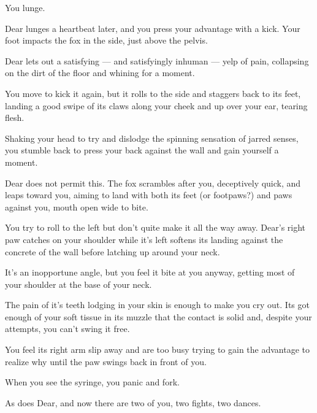 You lunge.

Dear lunges a heartbeat later, and you press your advantage with a kick. Your foot impacts the fox in the side, just above the pelvis.

Dear lets out a satisfying --- and satisfyingly inhuman --- yelp of pain, collapsing on the dirt of the floor and whining for a moment.

You move to kick it again, but it rolls to the side and staggers back to its feet, landing a good swipe of its claws along your cheek and up over your ear, tearing flesh.

Shaking your head to try and dislodge the spinning sensation of jarred senses, you stumble back to press your back against the wall and gain yourself a moment.

Dear does not permit this. The fox scrambles after you, deceptively quick, and leaps toward you, aiming to land with both its feet (or footpaws?) and paws against you, mouth open wide to bite.

You try to roll to the left but don't quite make it all the way away. Dear's right paw catches on your shoulder while it's left softens its landing against the concrete of the wall before latching up around your neck.

It's an inopportune angle, but you feel it bite at you anyway, getting most of your shoulder at the base of your neck.

The pain of it's teeth lodging in your skin is enough to make you cry out. Its got enough of your soft tissue in its muzzle that the contact is solid and, despite your attempts, you can't swing it free.

\newpage

\null
\vfill

\noindent You feel its right arm slip away and are too busy trying to gain the advantage to realize why until the paw swings back in front of you.

\vfill

\newpage

\null
\vfill

When you see the syringe, you panic and fork.

\vfill

\newpage

\null
\vfill

As does Dear, and now there are two of you, two fights, two dances.

\vfill

\newpage

